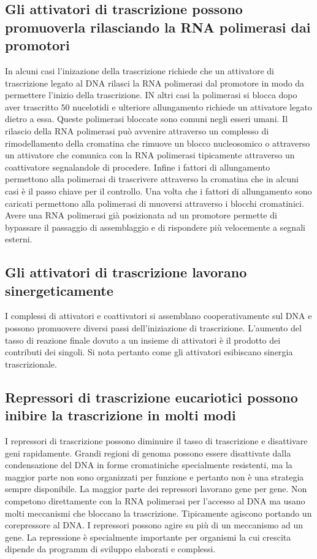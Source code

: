 \subsection{Gli attivatori di trascrizione possono promuoverla rilasciando la RNA polimerasi dai promotori}
In alcuni casi l'inizazione della trascrizione richiede che un attivatore di trascrizione legato al DNA rilasci la RNA polimerasi dal promotore in modo da permettere l'inizio della
trascrizione. IN altri casi la polimerasi si blocca dopo aver trascritto $50$ nucelotidi e ulteriore allungamento richiede un attivatore legato dietro a essa. Queste polimerasi bloccate
sono comuni negli esseri umani. Il rilascio della RNA polimerasi pu\`o avvenire attraverso un complesso di rimodellamento della cromatina che rimuove un blocco nucleosomico o attraverso
un attivatore che comunica con la RNA polimerasi tipicamente attraverso un coattivatore segnalandole di procedere. Infine i fattori di allungamento permettono alla polimerasi di 
trascrivere attraverso la cromatina che in alcuni casi \`e il passo chiave per il controllo. Una volta che i fattori di allungamento sono caricati permettono alla polimerasi di muoversi
attraverso i blocchi cromatinici. Avere una RNA polimerasi gi\`a posizionata ad un promotore permette di bypassare il passaggio di assemblaggio e di rispondere pi\`u velocemente a 
segnali esterni.
\subsection{Gli attivatori di trascrizione lavorano sinergeticamente}
I complessi di attivatori e coattivatori si assemblano cooperativamente sul DNA e possono promuovere diversi passi dell'iniziazione di trascrizione. L'aumento del tasso di reazione 
finale dovuto a un insieme di attivatori \`e il prodotto dei contributi dei singoli. Si nota pertanto come gli attivatori esibiscano sinergia trascrizionale. 
\subsection{Repressori di trascrizione eucariotici possono inibire la trascrizione in molti modi}
I repressori di trascrizione possono diminuire il tasso di trascrizione e disattivare geni rapidamente. Grandi regioni di genoma possono essere disattivate dalla condensazione del DNA
in forme cromatiniche specialmente resistenti, ma la maggior parte non sono organizzati per funzione e pertanto non \`e una strategia sempre disponibile. La maggior parte dei repressori
lavorano gene per gene. Non competono direttamente con la RNA polimerasi per l'accesso al DNA ma usano molti meccanismi che bloccano la trascrizione. Tipicamente agiscono portando un
corepressore al DNA. I repressori possono agire su pi\`u di un meccanismo ad un gene. La repressione \`e specialmente importante per organismi la cui crescita dipende da programm di 
sviluppo elaborati e complessi. 
